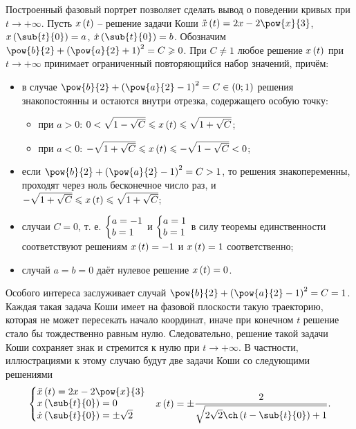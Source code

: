 \documentclass[a5paper,10pt]{article}
\begin{document}
\pagebreak
Построенный фазовый портрет позволяет сделать вывод о поведении кривых при 
$t \to +\infty$. 
Пусть $x\left(\hspace{0.01em}t\hspace{0.01em}\right)$ -- решение задачи Коши 
$\ddot{x}\br{t} = 2x - 2\pow{x}{3}$, $x\br{\sub{t}{0}} = a$, $\dot{x}\br{\sub{t}{0}} = b$.
Обозначим $\pow{b}{2} + \br{\pow{a}{2} + 1}^2 = C \ge 0$. 
При $C \ne 1$ любое решение $x\left(\hspace{0.01em}t\hspace{0.01em}\right)$ при $t \to +\infty$ 
принимает ограниченный повторяющийся набор значений, причём:
\begin{itemize}
    \item в случае $\pow{b}{2} + \br{\pow{a}{2} - 1}^2 = C \in \br{0; 1}$
    решения знакопостоянны и остаются внутри отрезка, содержащего особую точку:
    \begin{itemize}
        \item при $a > 0$: $0 < \sqrt{1 - \sqrt{C}} \leqslant x\left(\hspace{0.01em}t\hspace{0.01em}\right) \leqslant \sqrt{1 + \sqrt{C}}$;
        \item при $a < 0$: $-\sqrt{1 + \sqrt{C}} \leqslant x\left(\hspace{0.01em}t\hspace{0.01em}\right) \leqslant -\sqrt{1 - \sqrt{C}} < 0$;
    \end{itemize}

    \item если $\pow{b}{2} + \br{\pow{a}{2} - 1}^2 = C > 1$, то решения знакопеременны, 
    проходят через ноль бесконечное число раз, и
    $-\sqrt{1 + \sqrt{C}} \leqslant x\left(\hspace{0.01em}t\hspace{0.01em}\right) \leqslant \sqrt{1 + \sqrt{C}}$;
    \item случаи $C = 0$, т. е.
    $\tsys{a = -1 \\ b = 1}$ и $\tsys{a = 1 \\ b = 1}$ в силу теоремы единственности 
    соответствуют решениям $x\left(\hspace{0.01em}t\hspace{0.01em}\right) = -1$ и $x\left(\hspace{0.01em}t\hspace{0.01em}\right) = 1$ соответственно;
    \item случай $a = b = 0$ даёт нулевое решение $x\left(\hspace{0.01em}t\hspace{0.01em}\right) = 0$.
\end{itemize}
Особого интереса заслуживает случай $\pow{b}{2} + \br{\pow{a}{2} - 1}^2 = C = 1$.
Каждая такая задача Коши имеет на фазовой плоскости такую траекторию, которая не может пересекать 
начало координат, иначе при конечном $t$ решение стало бы тождественно равным нулю. Следовательно, 
решение такой задачи Коши сохраняет знак и стремится к нулю при $t \to +\infty$.
В частности, иллюстрациями к этому случаю будут две задачи Коши со следующими решениями
\begin{align*}
    \tsys{\ddot{x}\br{t} = 2x - 2\pow{x}{3} \\ x\br{\sub{t}{0}} = 0 \\ \dot{x}\br{\sub{t}{0}} = \pm \sqrt{2}}
    && x\br{t} = \pm \dfrac {2} {\sqrt{2\sqrt{2} \ch\br{t - \sub{t}{0}} + 1}}.
\end{align*}
\end{document}

